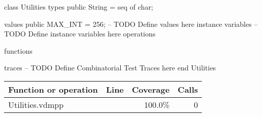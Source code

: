 \begin{vdmpp}[breaklines=true]
class Utilities
types
 public String = seq of char;
 
values
 public MAX_INT = 256;
-- TODO Define values here
instance variables
-- TODO Define instance variables here
operations
 

functions
 
traces
-- TODO Define Combinatorial Test Traces here
end Utilities
\end{vdmpp}
\bigskip
\begin{longtable}{|l|r|r|r|}
\hline
Function or operation & Line & Coverage & Calls \\
\hline
\hline
\hline
Utilities.vdmpp & & 100.0\% & 0 \\
\hline
\end{longtable}

